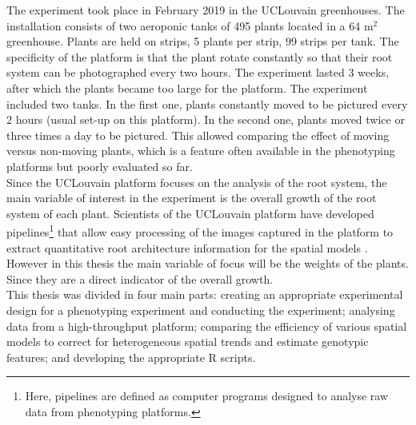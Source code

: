 The experiment took place in February 2019 in the UCLouvain greenhouses. The installation consists of two aeroponic tanks of 495 plants located in a 64 m$^2$ greenhouse. Plants are held on strips, 5 plants per strip, 99 strips per tank. The specificity of 
the platform is that the plant rotate constantly so that their root system can be photographed every two hours.
The experiment lasted 3 weeks, after which the plants became too large for the platform. The experiment included two tanks. In the first one, plants constantly moved to be pictured every 2 hours (usual set-up on this platform). In the second one, plants  moved twice or three times a day to be pictured. This allowed comparing the effect of moving versus non-moving plants, which is a feature often available in the phenotyping platforms but poorly evaluated so far.\\

Since the UCLouvain platform focuses on the analysis of the root system, the main variable of interest in the experiment is the overall growth of the root system of each plant. 
Scientists of the UCLouvain platform have developed pipelines\footnote{Here, pipelines are defined as computer programs designed to analyse raw data from phenotyping platforms.} that allow easy processing of the images captured in the platform to extract quantitative root architecture information for the spatial models \parencite{lobet_novel_2013,lobet_novel_2011}. However in this thesis the main variable of focus will be the weights of the plants. Since they are a direct indicator of the overall growth.\\

This thesis was divided in four main parts: creating an appropriate experimental design for a phenotyping experiment and conducting the experiment; analysing data from a high-throughput platform; comparing the efficiency of various spatial models to correct for heterogeneous spatial trends and estimate genotypic features; and developing the appropriate R scripts.